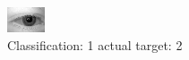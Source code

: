 \begin{figure}[h!]
\begin{center}
\includegraphics[width=0.60\columnwidth]{figures/ID505_class_1_target_2.png}
\end{center}
\caption{ Classification: 1 actual target: 2}
\label{fig:ID505_class_1_target_2}
\end{figure}
